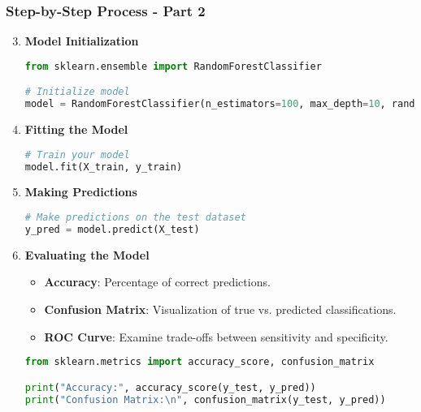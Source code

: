 \documentclass[aspectratio=169]{beamer}
\begin{document}
\begin{frame}[fragile]
    \frametitle{Step-by-Step Process - Part 2}
    \begin{enumerate}
        \setcounter{enumi}{2}
        \item \textbf{Model Initialization}
            \begin{lstlisting}[language=Python]
from sklearn.ensemble import RandomForestClassifier

# Initialize model
model = RandomForestClassifier(n_estimators=100, max_depth=10, random_state=42)
            \end{lstlisting}

        \item \textbf{Fitting the Model}
            \begin{lstlisting}[language=Python]
# Train your model
model.fit(X_train, y_train)
            \end{lstlisting}

        \item \textbf{Making Predictions}
            \begin{lstlisting}[language=Python]
# Make predictions on the test dataset
y_pred = model.predict(X_test)
            \end{lstlisting}

        \item \textbf{Evaluating the Model}
            \begin{itemize}
                \item \textbf{Accuracy}: Percentage of correct predictions.
                \item \textbf{Confusion Matrix}: Visualization of true vs. predicted classifications.
                \item \textbf{ROC Curve}: Examine trade-offs between sensitivity and specificity.
            \end{itemize}
            \begin{lstlisting}[language=Python]
from sklearn.metrics import accuracy_score, confusion_matrix

print("Accuracy:", accuracy_score(y_test, y_pred))
print("Confusion Matrix:\n", confusion_matrix(y_test, y_pred))
            \end{lstlisting}

    \end{enumerate}
\end{frame}
\end{document}
